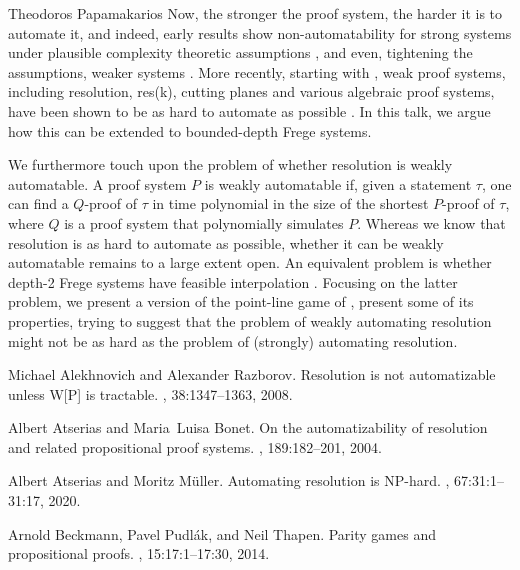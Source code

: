 \documentclass[report]{owrart}
\begin{document}
\begin{report}
\begin{talk}{Theodoros Papamakarios}
Now, the stronger the proof system, the harder it is to automate it, and indeed, early results show non-automatability for strong systems under plausible complexity theoretic assumptions \cite{KrajPudl98,Boneetal00}, and even, tightening the assumptions, weaker systems \cite{Boneetal04,AlekRazb08}. More recently, starting with \cite{AtseMull20}, weak proof systems, including resolution, res(k), cutting planes and various algebraic proof systems, have been shown to be as hard to automate as possible \cite{AtseMull20,Goosetal20,Garl20,Rezeetal21}. In this talk, we argue how this can be extended to bounded-depth Frege systems.

We furthermore touch upon the problem of whether resolution is weakly automatable. A proof system $P$ is weakly automatable if, given a statement $\tau$, one can find a $Q$-proof of $\tau$ in time polynomial in the size of the shortest $P$-proof of $\tau$, where $Q$ is a proof system that polynomially simulates $P$. Whereas we know that resolution is as hard to automate as possible, whether it can be weakly automatable remains to a large extent open. An equivalent problem is whether depth-2 Frege systems have feasible interpolation \cite{Boneetal04,Becketal14}. Focusing on the latter problem, we present a version of the point-line game of \cite{Becketal14}, present some of its properties, trying to suggest that the problem of weakly automating resolution might not be as hard as the problem of (strongly) automating resolution.
  
  \begin{thebibliography}{99}
  
    Michael Alekhnovich and Alexander Razborov.
    \newblock Resolution is not automatizable unless {W[P]} is tractable.
    , 38:1347--1363, 2008.
    
    Albert Atserias and Maria~Luisa Bonet.
    \newblock On the automatizability of resolution and related propositional proof
      systems.
    , 189:182--201, 2004.
    
    Albert Atserias and Moritz M{\"{u}}ller.
    \newblock Automating resolution is {NP}-hard.
    , 67:31:1--31:17, 2020.
    
    Arnold Beckmann, Pavel Pudl{\'{a}}k, and Neil Thapen.
    \newblock Parity games and propositional proofs.
    , 15:17:1--17:30,
      2014.
    

\end{thebibliography}
\end{talk}
\end{report}
\end{document}
